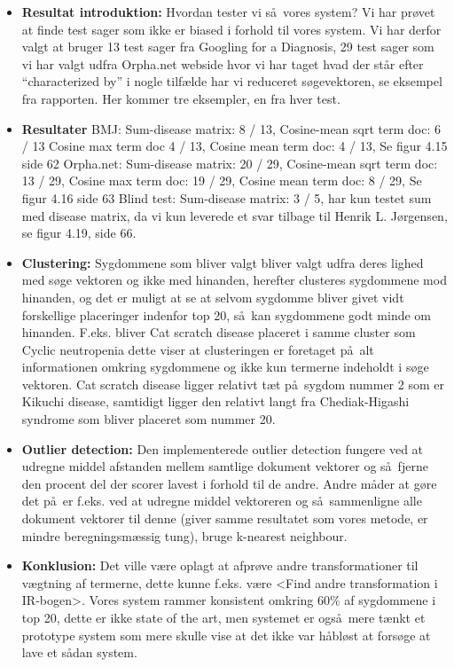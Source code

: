 \documentclass[a4paper, 10pt, english, final]{report}
\begin{document}
\begin{itemize}
    \item \textbf{Resultat introduktion:} Hvordan tester vi s\aa\ vores system? Vi har pr\o vet at finde test sager som ikke er biased i forhold til vores system. Vi har derfor valgt at bruger 13 test sager fra Googling for a Diagnosis, 29 test sager som vi har valgt udfra Orpha.net webside hvor vi har taget hvad der st\aa r efter ``characterized by'' i nogle tilf\ae lde har vi reduceret s\o gevektoren, se eksempel fra rapporten. Her kommer tre eksempler, en fra hver test.

    \item \textbf{Resultater} BMJ: Sum-disease matrix: 8 / 13, Cosine-mean sqrt term doc: 6 / 13 Cosine max term doc 4 / 13, Cosine mean term doc: 4 / 13, Se figur 4.15 side 62
      Orpha.net: Sum-disease matrix: 20 / 29, Cosine-mean sqrt term doc: 13 / 29, Cosine max term doc: 19 / 29, Cosine mean term doc: 8 / 29, Se figur 4.16 side 63
      Blind test: Sum-disease matrix: 3 / 5, har kun testet sum med disease matrix, da vi kun leverede et svar tilbage til Henrik L. J\o rgensen, se figur 4.19, side 66.

    \item \textbf{Clustering:} Sygdommene som bliver valgt bliver valgt udfra deres lighed med s\o ge vektoren og ikke med hinanden, herefter clusteres sygdommene mod hinanden, og det er muligt at se at selvom sygdomme bliver givet vidt forskellige placeringer indenfor top 20, s\aa\ kan sygdommene godt minde om hinanden. F.eks. bliver Cat scratch disease placeret i samme cluster som Cyclic neutropenia dette viser at clusteringen er foretaget p\aa\ alt informationen omkring sygdommene og ikke kun termerne indeholdt i s\o ge vektoren. Cat scratch disease ligger relativt t\ae t p\aa\ sygdom nummer 2 som er Kikuchi disease, samtidigt ligger den relativt langt fra Chediak-Higashi syndrome som bliver placeret som nummer 20.

    \item \textbf{Outlier detection:} Den implementerede outlier detection fungere ved at udregne middel afstanden mellem samtlige dokument vektorer og s\aa\ fjerne den procent del der scorer lavest i forhold til de andre. Andre m\aa der at g\o re det p\aa\ er f.eks. ved at udregne middel vektoreren og s\aa\ sammenligne alle dokument vektorer til denne (giver samme resultatet som vores metode, er mindre beregningsm\ae ssig tung), bruge k-nearest neighbour.

    \item \textbf{Konklusion:} Det ville v\ae re oplagt at afpr\o ve andre transformationer til v\ae gtning af termerne, dette kunne f.eks. v\ae re <Find andre transformation i IR-bogen>.
      Vores system rammer konsistent omkring 60\% af sygdommene i top 20, dette er ikke state of the art, men systemet er ogs\aa\ mere t\ae nkt et prototype system som mere skulle vise at det ikke var h\aa bl\o st at fors\o ge at lave et s\aa dan system.

\end{itemize}
\end{document}
